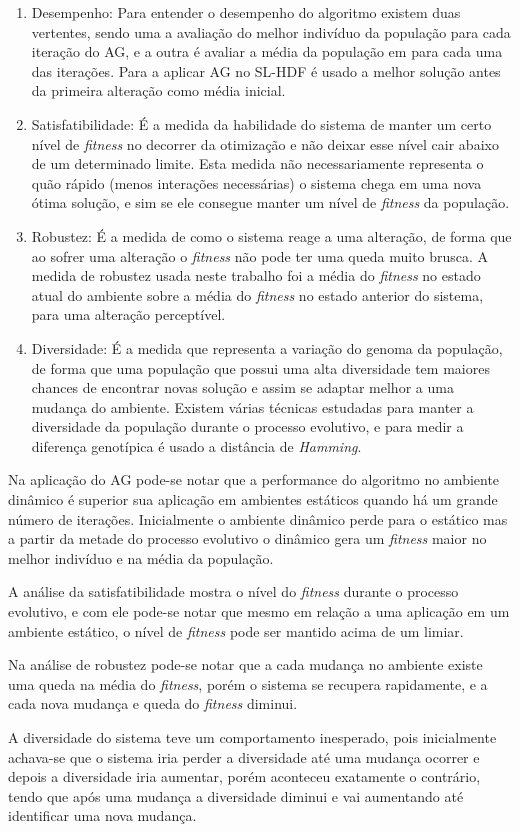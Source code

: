 \begin{enumerate}
	\item Desempenho: Para entender o desempenho do algoritmo existem duas vertentes, sendo uma a avaliação do melhor indivíduo da população para cada iteração do AG, e a outra é avaliar a média da população em para cada uma das iterações. Para a aplicar AG no SL-HDF é usado a melhor solução antes da primeira alteração como média inicial.

	\item Satisfatibilidade: É a medida da habilidade do sistema de manter um certo nível de \textit{fitness} no decorrer da otimização e não deixar esse nível cair abaixo de um determinado limite. Esta medida não necessariamente representa o quão rápido (menos interações necessárias) o sistema chega em uma nova ótima solução, e sim se ele consegue manter um nível de \textit{fitness} da população.

	\item Robustez: É a medida de como o sistema reage a uma alteração, de forma que ao sofrer uma alteração o \textit{fitness} não pode ter uma queda muito brusca. A medida de robustez usada neste trabalho foi a média do \textit{fitness} no estado atual do ambiente sobre a média do \textit{fitness} no estado anterior do sistema, para uma alteração perceptível.

	\item Diversidade: É a medida que representa a variação do genoma da população, de forma que uma população que possui uma alta diversidade tem maiores chances de encontrar novas solução e assim se adaptar melhor a uma mudança do ambiente. Existem várias técnicas estudadas para manter a diversidade da população durante o processo evolutivo, e para medir a diferença genotípica é usado a distância de \textit{Hamming}.
\end{enumerate}

Na aplicação do AG pode-se notar que a performance do algoritmo no ambiente dinâmico é superior sua aplicação em ambientes estáticos quando há um grande número de iterações. Inicialmente o ambiente dinâmico perde para o estático mas a partir da metade do processo evolutivo o dinâmico gera um \textit{fitness} maior no melhor indivíduo e na média da população.

A análise da satisfatibilidade mostra o nível do \textit{fitness} durante o processo evolutivo, e com ele pode-se notar que mesmo em relação a uma aplicação em um ambiente estático, o nível de \textit{fitness} pode ser mantido acima de um limiar.

Na análise de robustez pode-se notar que a cada mudança no ambiente existe uma queda na média do \textit{fitness}, porém o sistema se recupera rapidamente, e a cada nova mudança e queda do \textit{fitness} diminui.

A diversidade do sistema teve um comportamento inesperado, pois inicialmente achava-se que o sistema iria perder a diversidade até uma mudança ocorrer e depois a diversidade iria aumentar, porém aconteceu exatamente o contrário, tendo que após uma mudança a diversidade diminui e vai aumentando até identificar uma nova mudança.
